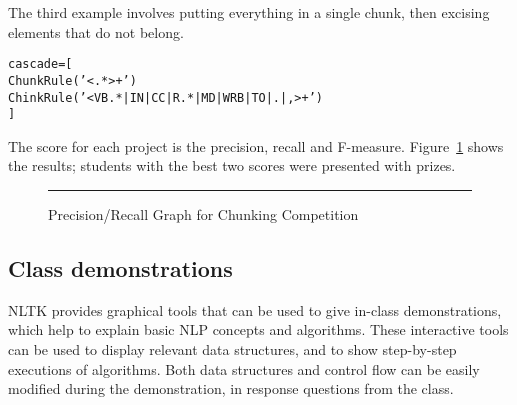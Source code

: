 \documentclass[11pt]{article}
\newenvironment{sv}{\scriptsize\begin{alltt}}{\end{alltt}\normalsize}
\begin{document}
The third example involves putting everything in a single chunk,
then excising elements that do not belong.

\begin{sv}
cascade = [
  ChunkRule('<.*>+')
  ChinkRule('<VB.*|IN|CC|R.*|MD|WRB|TO|.|,>+')
]
\end{sv}

%
%
%
%
%
% 

The score for each project is the precision, recall and F-measure.
Figure~\ref{fig:contest} shows the results; students with the best two
scores were presented with prizes.

\begin{figure}
\centerline{}
\caption{Precision/Recall Graph for Chunking Competition}\label{fig:contest}
\vspace*{2ex}\hrule
\end{figure}

\subsection{Class demonstrations}

NLTK provides graphical tools that can be used to give in-class
demonstrations, which help to explain basic NLP concepts and
algorithms.  These interactive tools can be used to display relevant
data structures, and to show step-by-step executions of algorithms.
Both data structures and control flow can be easily modified during
the demonstration, in response questions from the class.
\end{document}
